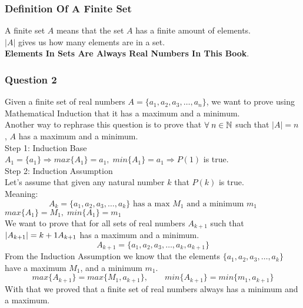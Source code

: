 \subsubsection{Definition Of A Finite Set}
A finite set $A$ means that the set $A$ has a finite amount of elements.\\
$|A|$ gives us how many elements are in a set.\\
\textbf{Elements In Sets Are Always Real Numbers In This Book}.\\
\subsubsection{Question 2}
Given a finite set of real numbers $A = \{a_1,a_2,a_3,\ldots,a_n\}$, we want to prove using Mathematical Induction that it has a maximum and a minimum.\\
Another way to rephrase this question is to prove that $\forall\; n\in \mathbb{N}$ such that $|A| = n$ , $A$ has a maximum and a minimum.\\
Step 1: Induction Base\\
$A_1 = \{a_1\} \Longrightarrow max\{A_1\} = a_1,\; min\{A_1\} = a_1 \Longrightarrow P(1)$ is true.\\
Step 2: Induction Assumption\\
Let's assume that given any natural number $k$ that $P(k)$ is true.\\
Meaning:
\[
    A_k = \{a_1,a_2,a_3,\ldots,a_k\} \text{ has a max } M_1 \text{ and a minimum } m_1
\]
$max\{A_1\} = M_1,\; min\{A_1\} = m_1$\\
We want to prove that for all sets of real numbers $A_{k+1}$ such that $|A_{k+1}| = k+1\\ A_{k+1}$ has a maximum and a minimum.\\
\[
    A_{k+1} = \{a_1,a_2,a_3,\ldots,a_k,a_{k+1}\}  
\]
From the Induction Assumption we know that the elements $\{a_1,a_2,a_3,\ldots,a_k\}$ have a maximum $M_1$, and a minimum $m_1$.\\
\[
    max\{A_{k+1}\} = max\{M_1,a_{k+1}\},\qquad min\{A_{k+1}\} = min\{m_1,a_{k+1}\}
\]
With that we proved that a finite set of real numbers always has a minimum and a maximum.









